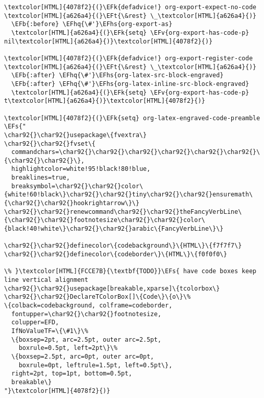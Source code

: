 \documentclass{scrartcl}
\newcommand{\EFk}[1]{\textcolor{EFk}{#1}} %
\newcommand{\EFt}[1]{\textcolor{EFt}{#1}} %
\newcommand{\EFs}[1]{\textcolor{EFs}{#1}} %
\newcommand{\EFb}[1]{\textcolor{EFb}{#1}} %
\newcommand{\EFv}[1]{\textcolor{EFv}{#1}} %
\newcommand{\EFhq}[1]{\textcolor{EFhq}{#1}} %
\newcommand{\EFhs}[1]{\textcolor{EFhs}{#1}} %
\begin{document}
\begin{enumerate}
\begin{Code}
\begin{Verbatim}[]
\textcolor[HTML]{4078f2}{(}\EFk{defadvice!} org-export-expect-no-code \textcolor[HTML]{a626a4}{(}\EFt{\&rest} \_\textcolor[HTML]{a626a4}{)}
  \EFb{:before} \EFhq{\#'}\EFhs{org-export-as}
  \textcolor[HTML]{a626a4}{(}\EFk{setq} \EFv{org-export-has-code-p} nil\textcolor[HTML]{a626a4}{)}\textcolor[HTML]{4078f2}{)}

\textcolor[HTML]{4078f2}{(}\EFk{defadvice!} org-export-register-code \textcolor[HTML]{a626a4}{(}\EFt{\&rest} \_\textcolor[HTML]{a626a4}{)}
  \EFb{:after} \EFhq{\#'}\EFhs{org-latex-src-block-engraved}
  \EFb{:after} \EFhq{\#'}\EFhs{org-latex-inline-src-block-engraved}
  \textcolor[HTML]{a626a4}{(}\EFk{setq} \EFv{org-export-has-code-p} t\textcolor[HTML]{a626a4}{)}\textcolor[HTML]{4078f2}{)}

\textcolor[HTML]{4078f2}{(}\EFk{setq} org-latex-engraved-code-preamble \EFs{"
\char92{}\char92{}usepackage\{fvextra\}
\char92{}\char92{}fvset\{
  commandchars=\char92{}\char92{}\char92{}\char92{}\char92{}\char92{}\{\char92{}\char92{}\},
  highlightcolor=white!95!black!80!blue,
  breaklines=true,
  breaksymbol=\char92{}\char92{}color\{white!60!black\}\char92{}\char92{}tiny\char92{}\char92{}ensuremath\{\char92{}\char92{}hookrightarrow\}\}
\char92{}\char92{}renewcommand\char92{}\char92{}theFancyVerbLine\{\char92{}\char92{}footnotesize\char92{}\char92{}color\{black!40!white\}\char92{}\char92{}arabic\{FancyVerbLine\}\}

\char92{}\char92{}definecolor\{codebackground\}\{HTML\}\{f7f7f7\}
\char92{}\char92{}definecolor\{codeborder\}\{HTML\}\{f0f0f0\}

\% }\textcolor[HTML]{FCCE7B}{\textbf{TODO}}\EFs{ have code boxes keep line vertical alignment
\char92{}\char92{}usepackage[breakable,xparse]\{tcolorbox\}
\char92{}\char92{}DeclareTColorBox[]\{Code\}\{o\}\%
\{colback=codebackground, colframe=codeborder,
  fontupper=\char92{}\char92{}footnotesize,
  colupper=EFD,
  IfNoValueTF=\{\#1\}\%
  \{boxsep=2pt, arc=2.5pt, outer arc=2.5pt,
    boxrule=0.5pt, left=2pt\}\%
  \{boxsep=2.5pt, arc=0pt, outer arc=0pt,
    boxrule=0pt, leftrule=1.5pt, left=0.5pt\},
  right=2pt, top=1pt, bottom=0.5pt,
  breakable\}
"}\textcolor[HTML]{4078f2}{)}


\end{Verbatim}
\end{Code}
\end{enumerate}
\end{document}
